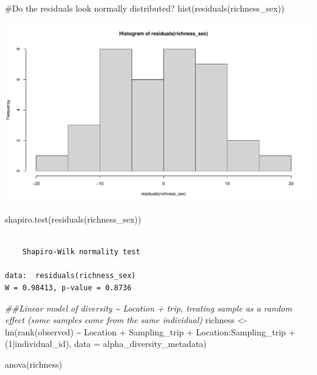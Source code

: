 \documentclass[
  letterpaper,
  DIV=11,
  numbers=noendperiod]{scrartcl}
\newenvironment{Shaded}{\begin{snugshade}}{\end{snugshade}}
\newcommand{\AttributeTok}[1]{\textcolor[rgb]{0.40,0.45,0.13}{#1}}
\newcommand{\CommentTok}[1]{\textcolor[rgb]{0.37,0.37,0.37}{#1}}
\newcommand{\DecValTok}[1]{\textcolor[rgb]{0.68,0.00,0.00}{#1}}
\newcommand{\DocumentationTok}[1]{\textcolor[rgb]{0.37,0.37,0.37}{\textit{#1}}}
\newcommand{\FunctionTok}[1]{\textcolor[rgb]{0.28,0.35,0.67}{#1}}
\newcommand{\NormalTok}[1]{\textcolor[rgb]{0.00,0.23,0.31}{#1}}
\newcommand{\OtherTok}[1]{\textcolor[rgb]{0.00,0.23,0.31}{#1}}
\newcommand{\SpecialCharTok}[1]{\textcolor[rgb]{0.37,0.37,0.37}{#1}}
\begin{document}
\begin{Shaded}
\begin{Highlighting}[]
\CommentTok{\#Do the residuals look normally distributed?}
\FunctionTok{hist}\NormalTok{(}\FunctionTok{residuals}\NormalTok{(richness\_sex))}
\end{Highlighting}
\end{Shaded}

\includegraphics{code_files/figure-pdf/unnamed-chunk-4-1.pdf}

\begin{Shaded}
\begin{Highlighting}[]
\FunctionTok{shapiro.test}\NormalTok{(}\FunctionTok{residuals}\NormalTok{(richness\_sex))}
\end{Highlighting}
\end{Shaded}

\begin{verbatim}

    Shapiro-Wilk normality test

data:  residuals(richness_sex)
W = 0.98413, p-value = 0.8736
\end{verbatim}

\begin{Shaded}
\begin{Highlighting}[]
\DocumentationTok{\#\#Linear model of diversity \textasciitilde{} Location + trip, treating sample as a random effect (some samples come from the same individual)}
\NormalTok{richness }\OtherTok{\textless{}{-}} \FunctionTok{lm}\NormalTok{(}\FunctionTok{rank}\NormalTok{(observed) }\SpecialCharTok{\textasciitilde{}}\NormalTok{ Location }\SpecialCharTok{+}\NormalTok{ Sampling\_trip }\SpecialCharTok{+}\NormalTok{ Location}\SpecialCharTok{:}\NormalTok{Sampling\_trip }\SpecialCharTok{+}\NormalTok{ (}\DecValTok{1}\SpecialCharTok{|}\NormalTok{individual\_id), }\AttributeTok{data =}\NormalTok{ alpha\_diversity\_metadata)}

\FunctionTok{anova}\NormalTok{(richness)}
\end{Highlighting}
\end{Shaded}
\end{document}
